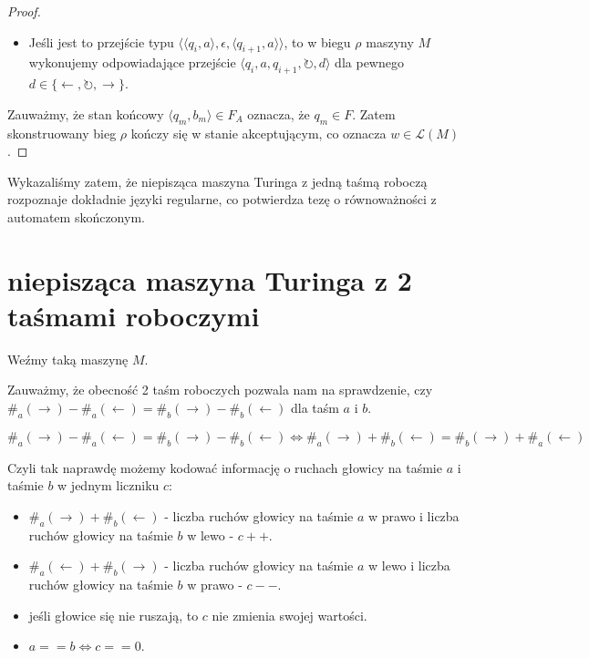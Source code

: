 \documentclass{article}
\theoremstyle{definition}
\theoremstyle{remark}
\begin{document}
\begin{proof}
\begin{itemize}
    \item Jeśli jest to przejście typu $\langle \langle q_i, a \rangle, \epsilon, \langle q_{i+1}, a \rangle \rangle$, to w biegu $\rho$ maszyny $M$ wykonujemy odpowiadające przejście $\langle q_i, a, q_{i+1}, \circlearrowright, d \rangle$ dla pewnego $d \in \{\leftarrow, \circlearrowright, \rightarrow\}$.
\end{itemize}

Zauważmy, że stan końcowy $\langle q_m, b_m \rangle \in F_A$ oznacza, że $q_m \in F$. Zatem skonstruowany bieg $\rho$ kończy się w stanie akceptującym, co oznacza $w \in \mathcal{L}(M)$.
\end{proof}

Wykazaliśmy zatem, że niepisząca maszyna Turinga z jedną taśmą roboczą rozpoznaje dokładnie języki regularne, co potwierdza tezę o równoważności z automatem skończonym.

\section{niepisząca maszyna Turinga z 2 taśmami roboczymi}
Weźmy taką maszynę \(M\).

Zauważmy, że obecność 2 taśm roboczych pozwala nam na sprawdzenie, czy 
\( \#_{a}(\rightarrow) - \#_{a}(\leftarrow) = \#_{b}(\rightarrow) -  \#_{b}(\leftarrow) \) dla taśm \(a\) i \(b\).

\[ \#_{a}(\rightarrow) - \#_{a}(\leftarrow) = \#_{b}(\rightarrow) -  \#_{b}(\leftarrow) \iff  \#_{a}(\rightarrow) + \#_{b}(\leftarrow) = \#_{b}(\rightarrow) + \#_{a}(\leftarrow) \]

Czyli tak naprawdę możemy kodować informację o ruchach głowicy na taśmie \(a\) i taśmie \(b\) w jednym liczniku \(c\):
\begin{itemize}
\item \( \#_{a}(\rightarrow) + \#_{b}(\leftarrow) \) - liczba ruchów głowicy na taśmie \(a\) w prawo i liczba ruchów głowicy na taśmie \(b\) w lewo - \(c++\).
\item \( \#_{a}(\leftarrow) + \#_{b}(\rightarrow) \) - liczba ruchów głowicy na taśmie \(a\) w lewo i liczba ruchów głowicy na taśmie \(b\) w prawo - \(c--\).
\item jeśli głowice się nie ruszają, to \(c\) nie zmienia swojej wartości.
\item \(a == b \iff c == 0\).
\end{itemize}
\end{document}
